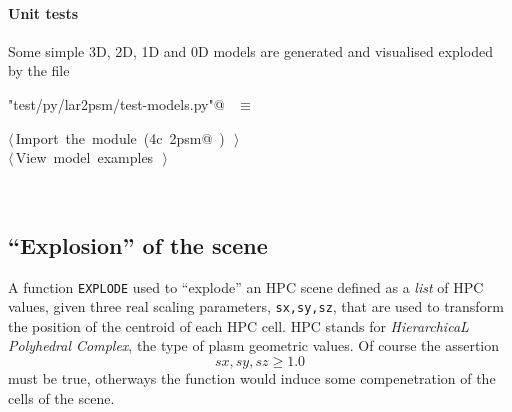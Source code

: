 \documentclass[11pt,oneside]{article}	%
\begin{document}
\paragraph{Unit tests}
Some simple 3D, 2D, 1D and 0D models are generated and visualised exploded by the file
\begin{flushleft} \small
\begin{minipage}{\linewidth} \label{scrap9}
\verb@"test/py/lar2psm/test-models.py"@\nobreak\ {\footnotesize {} }$\equiv$
\vspace{-1ex}
\begin{list}{}{} \item
\mbox{}\verb@@\hbox{$\langle\,$Import the module\nobreak\ ({\footnotesize 4c\label{scrap10}
 }\mbox{}\verb@lar2psm@ ) {\footnotesize {}}$\,\rangle$}\verb@@\\
\mbox{}\verb@@\hbox{$\langle\,$View model examples\nobreak\ {\footnotesize {}}$\,\rangle$}\verb@@\\
\mbox{}\verb@@{\NWsep}
\end{list}
\vspace{-2ex}
\end{minipage}\\[4ex]
\end{flushleft}

\subsection{``Explosion'' of the scene}

A function \texttt{EXPLODE} used to ``explode'' an HPC scene defined as a \emph{list} of HPC values, given three real scaling parameters, \texttt{sx,sy,sz}, that are used to transform the position of the centroid of each HPC cell. HPC stands for \emph{HierarchicaL Polyhedral Complex}, the  type of plasm geometric values. Of course the assertion
\[
sx,sy,sz \geq 1.0
\]
must be true, otherways the function would induce some compenetration of the cells of the scene.
\end{document}
